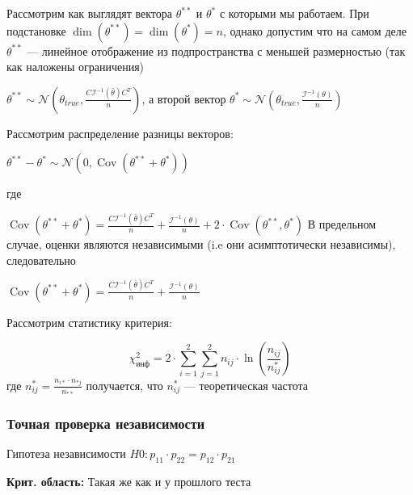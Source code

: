 \documentclass{article}
\begin{document}
    \quad

    Рассмотрим как выглядят вектора $\theta^{**}$ и $\theta^{*}$ с которыми мы работаем.
    При подстановке $\dim(\theta^{**}) = \dim(\theta^{*}) = n$, однако допустим что на самом деле
    $\theta^{**}$ --- линейное отображение из подпространства с меньшей размерностью (так как наложены ограничения)

    \quad

    $\theta^{**} \sim \mathcal{N}(\theta_{true}, \frac{ C \mathcal{I}^{-1}( \bar{\theta} )  C^{T} }{n})$, а второй вектор
    $\theta^{*} \sim \mathcal{N}(\theta_{true}, \frac{\mathcal{I}^{-1}( \theta )}{n})$

    Рассмотрим распределение разницы векторов:

    $\theta^{**} - \theta^{*} \sim \mathcal{N}(0, \operatorname{Cov}(\theta^{**} + \theta^{*}))$

    где

    $\operatorname{Cov}(\theta^{**} + \theta^{*}) = \frac{ C \mathcal{I}^{-1}( \bar{\theta} )  C^{T} }{n} + \frac{\mathcal{I}^{-1}( \theta )}{n} + 2 \cdot \operatorname{Cov}(\theta^{**}, \theta^{*})$
    В предельном случае, оценки являются независимыми (i.e они асимптотически независимы), следовательно

    $\operatorname{Cov}(\theta^{**} + \theta^{*}) = \frac{ C \mathcal{I}^{-1}( \bar{\theta} )  C^{T} }{n} + \frac{\mathcal{I}^{-1}( \theta )}{n}$



    \quad


    Рассмотрим статистику критерия:

    \begin{equation}
        \chi^{2}_{\text{инф}} = 2 \cdot \sum_{i=1}^{2} {\sum_{j=1}^{2} {n_{ij} \cdot \ln(\frac{n_{ij}}{n_{ij}^{*}}) } }
    \end{equation}
    где $n_{ij}^{*} = \frac{n_{i*} \cdot n_{*j}}{n_{**}}$ получается, что $n_{ij}^{*}$ --- теоретическая частота

    
    \subsubsection{Точная проверка независимости}

    Гипотеза независимости $H0: p_{11} \cdot p_{22} = p_{12} \cdot p_{21}$

    \textbf{Крит. область:} Такая же как и у прошлого теста
\end{document}
